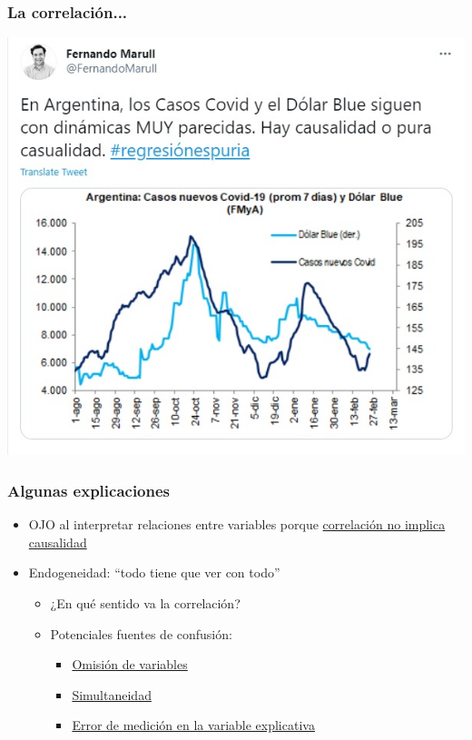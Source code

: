 \documentclass{beamer}
\begin{document}
\begin{frame}
\frametitle{La correlación...}
\begin{center}
    \includegraphics[scale=0.55]{Slides Principios de Economia/Figures/Introduccion_1.3.jpg}
\end{center}
\end{frame}

\begin{frame} \label{uno}
\frametitle{Algunas explicaciones}
\begin{itemize}
    \item OJO al interpretar relaciones entre variables porque \hyperlink{hdos}{correlación no implica causalidad}   \vspace{2mm}
    \item Endogeneidad: ``todo tiene que ver con todo'' \vspace{1mm}
    \begin{itemize} 
     \item ¿En qué sentido va la correlación?
        \item Potenciales fuentes de confusión:
        \begin{itemize}
            \item \hyperlink{htres}{Omisión de variables}  
            \item \hyperlink{hcuatro}{Simultaneidad} 
            \item \hyperlink{hcinco}{Error de medición en la variable explicativa}
        \end{itemize}
    \end{itemize}
\end{itemize}
\end{frame}
\end{document}

